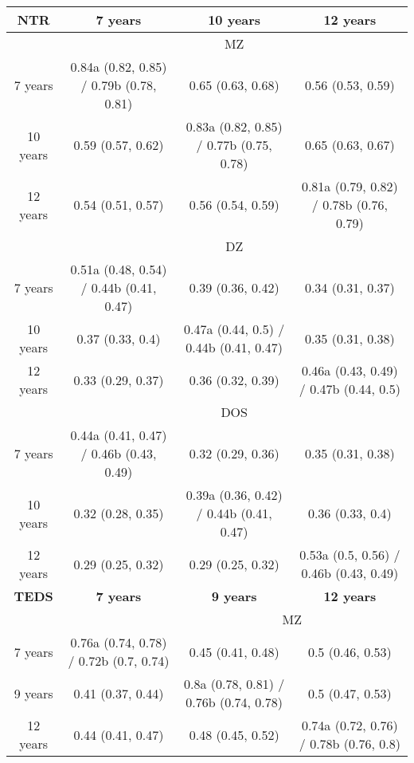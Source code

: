 \begin{tabular}{ccccc}
  \toprule
  \textbf{NTR} & \multicolumn{2}{c}{\textbf{7 years}} & \textbf{10 years} & \textbf{12 years} \\
  \midrule
  & \multicolumn{4}{c}{MZ} \\
  7 years & \multicolumn{2}{c}{0.84a (0.82, 0.85) / 0.79b (0.78, 0.81)} & 0.65 (0.63, 0.68) & 0.56 (0.53, 0.59) \\
  10 years & \multicolumn{2}{c}{0.59 (0.57, 0.62)} & 0.83a (0.82, 0.85) / 0.77b (0.75, 0.78) & 0.65 (0.63, 0.67) \\
  12 years & \multicolumn{2}{c}{0.54 (0.51, 0.57)} & 0.56 (0.54, 0.59) & 0.81a (0.79, 0.82) / 0.78b (0.76, 0.79) \\
  \cmidrule{1-4}          & \multicolumn{4}{c}{DZ} \\
  7 years & \multicolumn{2}{c}{0.51a (0.48, 0.54) / 0.44b (0.41, 0.47)} & 0.39 (0.36, 0.42) & 0.34 (0.31, 0.37) \\
  10 years & \multicolumn{2}{c}{0.37 (0.33, 0.4)} & 0.47a (0.44, 0.5) / 0.44b (0.41, 0.47) & 0.35 (0.31, 0.38) \\
  12 years & \multicolumn{2}{c}{0.33 (0.29, 0.37)} & 0.36 (0.32, 0.39) & 0.46a (0.43, 0.49) / 0.47b (0.44, 0.5) \\
  \cmidrule{1-4}          & \multicolumn{4}{c}{DOS} \\
  7 years & \multicolumn{2}{c}{0.44a (0.41, 0.47) / 0.46b (0.43, 0.49)} & 0.32 (0.29, 0.36) & 0.35 (0.31, 0.38) \\
  10 years & \multicolumn{2}{c}{0.32 (0.28, 0.35)} & 0.39a (0.36, 0.42) / 0.44b (0.41, 0.47) & 0.36 (0.33, 0.4) \\
  12 years & \multicolumn{2}{c}{0.29 (0.25, 0.32)} & 0.29 (0.25, 0.32) & 0.53a (0.5, 0.56) / 0.46b (0.43, 0.49) \\
  \midrule
  \textbf{TEDS} & \multicolumn{2}{c}{\textbf{7 years}} & \textbf{9 years} & \textbf{12 years} \\
  \midrule
  &       & \multicolumn{3}{c}{MZ} \\
  7 years & \multicolumn{2}{c}{0.76a (0.74, 0.78) / 0.72b (0.7, 0.74)} & 0.45 (0.41, 0.48) & 0.5 (0.46, 0.53) \\
  9 years & \multicolumn{2}{c}{0.41 (0.37, 0.44)} & 0.8a (0.78, 0.81) / 0.76b (0.74, 0.78) & 0.5 (0.47, 0.53) \\
  12 years & \multicolumn{2}{c}{0.44 (0.41, 0.47)} & 0.48 (0.45, 0.52) & 0.74a (0.72, 0.76) / 0.78b (0.76, 0.8) \\

\end{tabular}

